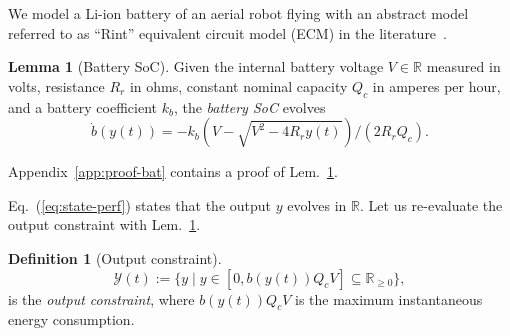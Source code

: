 \documentclass[letterpaper,10pt,journal,twoside]{IEEEtran}
\theoremstyle{definition}
\newtheorem{lem}[thm]{Lemma}
\newtheorem{defn}{Definition}[section]
\begin{document}
We model a Li-ion battery of an aerial robot flying with an abstract model referred to as ``Rint'' equivalent circuit model (ECM) in the literature~\cite{he2011evaluation,hinz2019comparison,mousavi2014various}.

\begin{lem}[Battery SoC]\label{lem:bat}
  Given the internal battery voltage $V\in\mathbb{R}$ measured in volts, resistance $R_r$ in ohms, constant nominal capacity $Q_c$ in amperes per hour, and a battery coefficient $k_b$, the \emph{battery SoC} evolves
  \begin{equation*}
    \dot{b}(y(t))=-k_b\left(V-
  \sqrt{
    V^2-
    4R_ry(t)}
  \right)/(2R_rQ_c).
  \end{equation*}
\end{lem}

Appendix~\ref{app:proof-bat} contains a proof of Lem.~\ref{lem:bat}. 

Eq.~(\ref{eq:state-perf}) states that the output $y$ evolves in $\mathbb{R}$. Let us re-evaluate the output constraint with Lem.~\ref{lem:bat}.

\begin{defn}[Output constraint]
  \label{def:const}
  \begin{equation*}
    \mathcal{Y}(t):=\{y\mid y\in[0,b(y(t))Q_cV]\subseteq{\mathbb{R}_{\geq 0}}\},
  \end{equation*}
  is the \emph{output constraint}, where $b(y(t))Q_cV$ is the maximum instantaneous energy consumption.
\end{defn}



\end{document}
